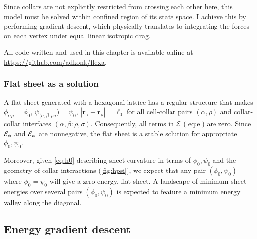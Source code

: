 Since collars are not explicitly restricted from crossing each other here, this model must be solved within confined region of its state space.
I achieve this by performing gradient descent, which physically translates to integrating the forces on each vertex under equal linear isotropic drag.

All code written and used in this chapter is available online at \url{https://github.com/adkonk/flexa}.

\subsubsection{Flat sheet as a solution} \label{subsubsec:flat}

A flat sheet generated with a hexagonal lattice has a regular structure that makes $\phi_{\alpha\rho} = \phi_0$, $\psi_{(\alpha,\beta:\rho\sigma}) = \psi_0$, $|\bm{r}_\alpha - \bm{r}_\rho| = \ell_0$ for all cell-collar pairs $(\alpha,\rho)$ and collar-collar interfaces $(\alpha,\beta:\rho,\sigma)$. 
Consequently, all terms in $\mathcal{E}$ (\cref{eq:e}) are zero.
Since $\mathcal{E}_\phi$ and $\mathcal{E}_\psi$ are nonnegative, the flat sheet is a stable solution for appropriate $\phi_0, \psi_0$. 

Moreover, given \cref{eq:h0} describing sheet curvature in terms of $\phi_0, \psi_0$ and the geometry of collar interactions (\cref{fig:hpsi}), we expect that any pair $(\phi_0, \psi_0)$ where $\phi_0 = \psi_0$ will give a zero energy, flat sheet.
A landscape of minimum sheet energies over several pairs $(\phi_0, \psi_0)$ is expected to feature a minimum energy valley along the diagonal.

% 
% 
% 
% 
% 

\subsection{Energy gradient descent} \label{subsec:grad_desc}

